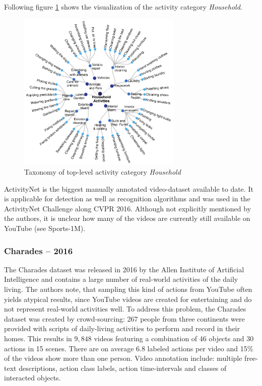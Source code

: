 Following figure \ref{fig:activitynet_taxonomy} shows the visualization of the activity category \textit{Household}.
\begin{figure}[H]
    \centering
    \includegraphics[width=0.7\textwidth]{img_datasets/activitynet_taxonomy}
    \caption{Taxonomy of top-level activity category \textit{Household} \cite{caba_heilbron_activitynet:_2015}}
    \label{fig:activitynet_taxonomy}
\end{figure}

ActivityNet is the biggest manually annotated video-dataset available to date.
It is applicable for detection as well as recognition algorithms and was used in the ActivityNet Challenge along CVPR 2016.
Although not explicitly mentioned by the authors, it is unclear how many of the videos are currently still available on YouTube (see Sports-1M).

\subsubsection{Charades -- 2016}
The Charades dataset \cite{sigurdsson_hollywood_2016} was released in 2016 by the Allen Institute of Artificial Intelligence and contains a large number of real-world activities of the daily living.
The authors note, that sampling this kind of actions from YouTube often yields atypical results, since YouTube videos are created for entertaining and do not represent real-world activities well.
To address this problem, the Charades dataset was created by crowd-sourcing: 267 people from three continents were provided with scripts of daily-living activities to perform and record in their homes.
This results in $9,848$ videos featuring a combination of 46 objects and 30 actions in 15 scenes.
There are on average $6.8$ labeled actions per video and 15\% of the videos show more than one person.
Video annotation include: multiple free-text descriptions, action class labels, action time-intervals and classes of interacted objects.


